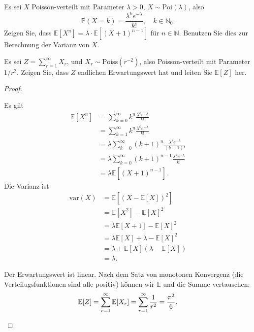 \begin{Problem}
	\begin{parts}
		\item Es sei $X$ Poisson-verteilt mit Parameter $\lambda > 0$, $X \sim \text{Poi}(\lambda)$, also
		\[
		\mathbb{P}(X = k) = \frac{\lambda^k e^{-\lambda}}{k!}, \quad k \in \mathbb{N}_0.
		\]
		Zeigen Sie, dass $\mathbb{E}[X^n] = \lambda \cdot \mathbb{E}[(X + 1)^{n-1}]$ für $n \in \mathbb{N}$. Benutzen Sie dies zur Berechnung der Varianz von $X$.
		
		\item Es sei $Z = \sum_{r=1}^\infty X_r$, und $X_r \sim \text{Poiss}(r^{-2})$, also Poisson-verteilt mit Parameter $1/r^2$.  
		Zeigen Sie, dass $Z$ endlichen Erwartungswert hat und leiten Sie $\mathbb{E}[Z]$ her.
	\end{parts}
\end{Problem}
\begin{proof}
	\begin{parts}
		\item Es gilt
		\begin{align*}
			\mathbb{E}[X^n] &= \sum_{k=0}^\infty k^n \frac{\lambda^k e^{-\lambda}}{k!}\\
			&=\sum_{k=1}^\infty k^n \frac{\lambda^k e^{-\lambda}}{k!}\\
			&=\lambda \sum_{k=0}^\infty (k+1)^n \frac{\lambda^k e^{-\lambda}}{(k+1)!}\\
			&=\lambda \sum_{k=0}^\infty (k+1)^{n-1} \frac{\lambda^k e^{-\lambda}}{k!}\\
			&= \lambda\mathbb{E}[(X+1)^{n-1}].
		\end{align*}
	Die Varianz ist
	\begin{align*}
	\text{var}(X) &= \mathbb{E}[(X - \mathbb{E}[X])^2] \\
	&=\mathbb{E}[X^2]-\mathbb{E}[X]^2 \\ 
	&=\lambda \mathbb{E}[X+1] - \mathbb{E}[X]^2\\
	&= \lambda \mathbb{E}[X] + \lambda - \mathbb{E}[X]^2\\
	&= \lambda + \mathbb{E}[X](\lambda - \mathbb{E}[X])\\
	&=\lambda.
\end{align*}
\item Der Erwartungswert ist linear. Nach dem Satz von monotonen Konvergenz (die Verteilugsfunktionen sind alle positiv) können wir $\mathbb{E}$ und die Summe vertauschen:
\[\mathbb{E}[Z] = \sum_{r=1}^\infty \mathbb{E}[X_r] = \sum_{r=1}^\infty \frac 1{r^2} = \frac{\pi^2}{6}.\qedhere\]
	\end{parts}
\end{proof}

